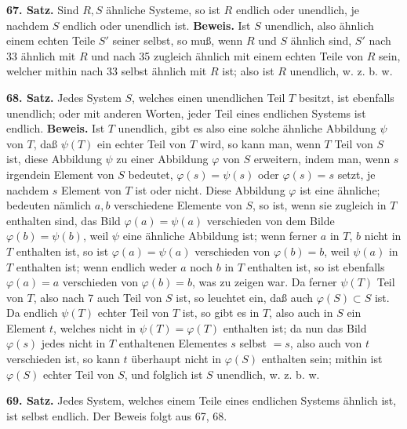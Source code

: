 \documentclass[11pt]{article}
\newcommand{\partof}{\mathrel{\subset}}
\begin{document}
\noindent\textbf{67. Satz.} Sind $R,S$ ähnliche Systeme, so ist $R$ endlich oder unendlich, je nachdem $S$ endlich oder unendlich ist. \textbf{Beweis.} Ist $S$ unendlich, also ähnlich einem echten Teile $S'$ seiner selbst, so muß, wenn $R$ und $S$ ähnlich sind, $S'$ nach 33 ähnlich mit $R$ und nach 35 zugleich ähnlich mit einem echten Teile von $R$ sein, welcher mithin nach 33 selbst ähnlich mit $R$ ist; also ist $R$ unendlich, w. z. b. w.

\noindent\textbf{68. Satz.} Jedes System $S$, welches einen unendlichen Teil $T$ besitzt, ist ebenfalls unendlich; oder mit anderen Worten, jeder Teil eines endlichen Systems ist endlich. \textbf{Beweis.} Ist $T$ unendlich, gibt es also eine solche ähnliche Abbildung $\psi$ von $T$, daß $\psi(T)$ ein echter Teil von $T$ wird, so kann man, wenn $T$ Teil von $S$ ist, diese Abbildung $\psi$ zu einer Abbildung $\varphi$ von $S$ erweitern, indem man, wenn $s$ irgendein Element von $S$ bedeutet, $\varphi(s)=\psi(s)$ oder $\varphi(s)=s$ setzt, je nachdem $s$ Element von $T$ ist oder nicht. Diese Abbildung $\varphi$ ist eine ähnliche; bedeuten nämlich $a,b$ verschiedene Elemente von $S$, so ist, wenn sie zugleich in $T$ enthalten sind, das Bild $\varphi(a)=\psi(a)$ verschieden von dem Bilde $\varphi(b)=\psi(b)$, weil $\psi$ eine ähnliche Abbildung ist; wenn ferner $a$ in $T$, $b$ nicht in $T$ enthalten ist, so ist $\varphi(a)=\psi(a)$ verschieden von $\varphi(b)=b$, weil $\psi(a)$ in $T$ enthalten ist; wenn endlich weder $a$ noch $b$ in $T$ enthalten ist, so ist ebenfalls $\varphi(a)=a$ verschieden von $\varphi(b)=b$, was zu zeigen war. Da ferner $\psi(T)$ Teil von $T$, also nach 7 auch Teil von $S$ ist, so leuchtet ein, daß auch $\varphi(S)\partof S$ ist. Da endlich $\psi(T)$ echter Teil von $T$ ist, so gibt es in $T$, also auch in $S$ ein Element $t$, welches nicht in $\psi(T)=\varphi(T)$ enthalten ist; da nun das Bild $\varphi(s)$ jedes nicht in $T$ enthaltenen Elementes $s$ selbst $=s$, also auch von $t$ verschieden ist, so kann $t$ überhaupt nicht in $\varphi(S)$ enthalten sein; mithin ist $\varphi(S)$ echter Teil von $S$, und folglich ist $S$ unendlich, w. z. b. w.

\noindent\textbf{69. Satz.} Jedes System, welches einem Teile eines endlichen Systems ähnlich ist, ist selbst endlich. Der Beweis folgt aus 67, 68.
\end{document}
